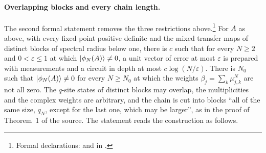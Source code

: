 \documentclass{article}
\begin{document}
\paragraph{Overlapping blocks and every chain length.}
The second formal statement removes the three restrictions above.\footnote{Formal
    declarations:
    and
    in .}
For $A$ as above, with every fixed point positive definite and the mixed
transfer maps of distinct blocks of spectral radius below one, there is $c$
such that for every $N\geq2$ and $0<\varepsilon\leq1$ at which
$|\phi_N(A)\rangle\neq0$, a unit vector of error at most $\varepsilon$ is prepared
with measurements and a circuit in depth at most $c\log(N/\varepsilon)$. There
is $N_0$ such that $|\phi_N(A)\rangle\neq0$ for every $N\geq N_0$ at which the
weights $\beta_j=\sum_k\mu_{j,k}^N$ are not all zero. The $q$-site states of
distinct blocks may overlap, the multiplicities and the complex weights are
arbitrary, and the chain is cut into blocks ``all of the same size, $q_N$,
except for the last one, which may be larger'', as in the proof of Theorem~1 of
the source. The statement reads the construction as follows.
\end{document}
